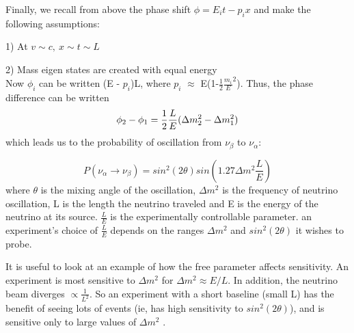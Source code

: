 \documentclass[12pt]{article}
\begin{document}
\noindent Finally, we recall from above the phase shift $\phi = E_i t-p_i x$ and make the following assumptions:
\par 1) At $v\sim c,\ x\sim t\sim L$
\par 2) Mass eigen states are created with equal energy\\
\noindent Now $\phi_i$ can be written (E - $p_i$)L, where $p_i$ $\approx$ E(1-$\frac{1}{2}\frac{m_i}{E}^2$). Thus, the phase difference can be written 
\begin{equation}
\\ \phi_2-\phi_1 = \frac{1}{2}\frac{L}{E}(\Delta m_2^2 - \Delta m_1^2)
\end{equation}
which leads us to the probability of oscillation from $\nu_\beta$ to $\nu_\alpha$:

\begin{equation} \label{eq:prob}
P(\nu_\alpha \rightarrow \nu_\beta) = sin^2(2\theta)sin(1.27\Delta m^2  \frac{L}{E})
\end{equation}
where $\theta$ is the mixing angle of the oscillation, $\Delta m^2$ is the frequency of neutrino oscillation, L is the length the neutrino traveled and E is the energy of the neutrino at its source.  $\frac{L}{E}$ is the experimentally controllable parameter. an experiment's choice of $\frac{L}{E}$ depends on the ranges $\Delta m^2$ and $sin^2(2\theta)$ it wishes to probe. 
\par It is useful to look at an example of how the free parameter affects sensitivity.  An experiment is most sensitive to $\Delta m^2$ for $\Delta m^2 \approx E/L$.  In addition, the neutrino beam diverges $\propto \frac{1}{L^2}$.  So an experiment with a short baseline (small L) has the benefit of seeing lots of events (ie, has high sensitivity to $sin^2(2\theta)$), and is sensitive only to large values of $\Delta m^2$ \cite{warwick}. 
\end{document}
